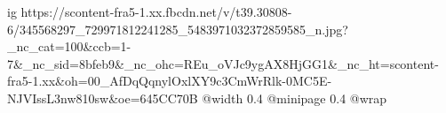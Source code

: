  
 
 
 
 

\ifcmt
  ig https://scontent-fra5-1.xx.fbcdn.net/v/t39.30808-6/345568297_729971812241285_5483971032372859585_n.jpg?_nc_cat=100&ccb=1-7&_nc_sid=8bfeb9&_nc_ohc=REu_oVJc9ygAX8HjGG1&_nc_ht=scontent-fra5-1.xx&oh=00_AfDqQqnylOxlXY9c3CmWrRlk-0MC5E-NJVIssL3nw810sw&oe=645CC70B
  @width 0.4
  @minipage 0.4
  @wrap \parpic[r]
\fi

